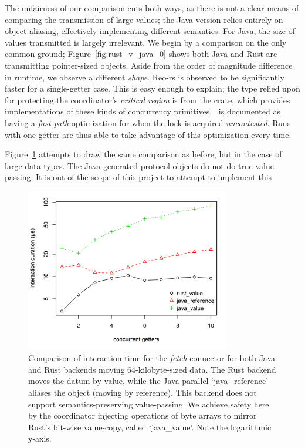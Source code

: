 The unfairness of our comparison cuts both ways, as there is not a clear means of comparing the transmission of large values; the Java version relies entirely on object-aliasing, effectively implementing different semantics. For Java, the size of values transmitted is largely irrelevant. We begin by a comparison on the only common ground; Figure~\ref{fig:rust_v_java_0} shows both Java and Rust are transmitting pointer-sized objects. Aside from the order of magnitude difference in runtime, we observe a different \textit{shape}. Reo-rs is observed to be significantly faster for a single-getter case. This is easy enough to explain; the type relied upon for protecting the coordinator's \textit{critical region} is  from the  crate, which provides implementations of these kinds of concurrency primitives. ~is documented as having a \textit{fast path} optimization for when the lock is acquired \textit{uncontested}. Runs with one getter are thus able to take advantage of this optimization every time.

Figure~\ref{fig:rust_v_java_2} attempts to draw the same comparison as before, but in the case of large data-types. The Java-generated protocol objects do not do true value-passing. It is out of the scope of this project to attempt to implement this

\begin{figure}
	\centering
	\includegraphics[width=0.80\textwidth]{experiments/rust_v_java_2.png}
	\caption[Java vs.\ Rust interaction time for large values.]{Comparison of interaction time for the \textit{fetch} connector for both Java and Rust backends moving 64-kilobyte-sized data. The Rust backend moves the datum by value, while the Java parallel `java\_reference' aliases the object (moving by reference). This backend does not support semantics-preserving value-passing. We achieve safety here by the coordinator injecting  operations of byte arrays to mirror Rust's bit-wise value-copy, called `java\_value'. Note the logarithmic y-axis.}
	\label{fig:rust_v_java_2}
\end{figure}


